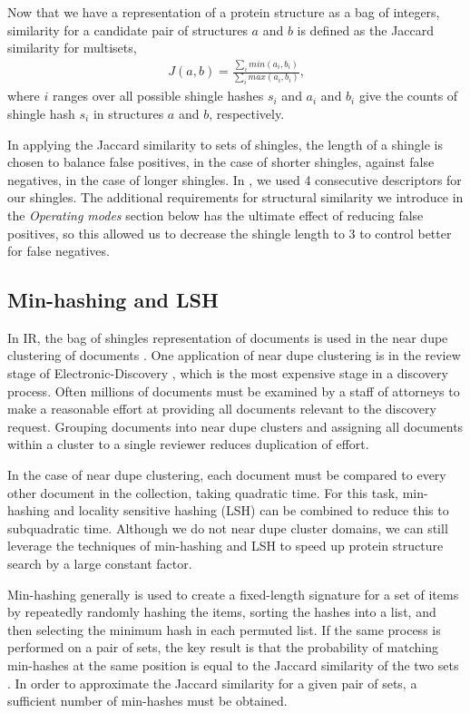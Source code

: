 \documentclass[10pt,letterpaper]{article}
\begin{document}
Now that we have a representation of a protein structure as a bag of integers, similarity for a candidate pair of structures $a$ and $b$ is defined as the Jaccard similarity \cite{Levan1971} for multisets,
\begin{align}
    J(a,b) = \frac{\sum_i min(a_i, b_i)}{\sum_i max(a_i,b_i)}\text{,}
\end{align}
where $i$ ranges over all possible shingle hashes $s_i$ and $a_i$ and $b_i$ give the counts of shingle hash $s_i$ in structures $a$ and $b$, respectively. 

In applying the Jaccard similarity to sets of shingles, the length of a shingle is chosen to balance false positives, in the case of shorter shingles, against false negatives, in the case of longer shingles.
In \cite{Ayoub2017}, we used 4 consecutive descriptors for our shingles. 
The additional requirements for structural similarity we introduce in the \emph{Operating modes} section below has the ultimate effect of reducing false positives, so this allowed us to decrease the shingle length to 3 to control better for false negatives. 

\subsection*{Min-hashing and LSH}

In IR, the bag of shingles representation of documents is used in the near dupe clustering of documents \cite{Broder1997b}.
One application of near dupe clustering is in the review stage of Electronic-Discovery \cite{Joshi2008}, which is the most expensive stage in a discovery process. 
Often millions of documents must be examined by a staff of attorneys to make a reasonable effort at providing all documents relevant to the discovery request. 
Grouping documents into near dupe clusters and assigning all documents within a cluster to a single reviewer reduces duplication of effort. 

In the case of near dupe clustering, each document must be compared to every other document in the collection, taking quadratic time.
For this task, min-hashing \cite{Broder1998} and locality sensitive hashing (LSH) \cite{Indyk1998} can be combined to reduce this to subquadratic time. 
Although we do not near dupe cluster domains, we can still leverage the techniques of min-hashing and LSH to speed up protein structure search by a large constant factor.

Min-hashing generally is used to create a fixed-length signature for a set of items by repeatedly randomly hashing the items, sorting the hashes into a list, and then selecting the minimum hash in each permuted list.
If the same process is performed on a pair of sets, the key result is that the probability of matching min-hashes at the same position is equal to the Jaccard similarity of the two sets \cite{Broder1998}.
In order to approximate the Jaccard similarity for a given pair of sets, a sufficient number of min-hashes must be obtained. 
\end{document}
